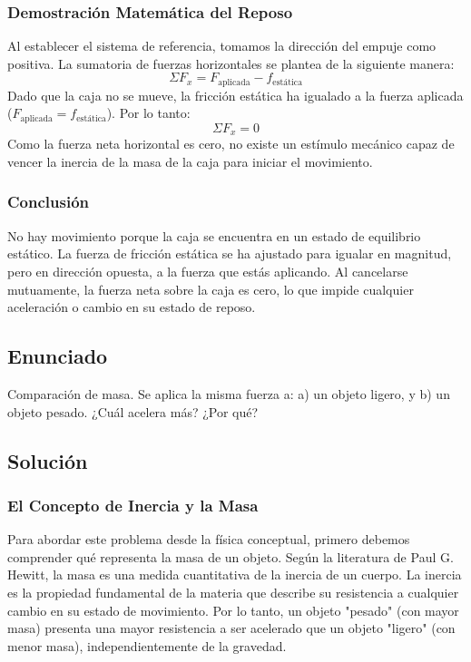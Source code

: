 \documentclass[12pt]{article}
\begin{document}
\subsubsection*{Demostración Matemática del Reposo}
Al establecer el sistema de referencia, tomamos la dirección del empuje como positiva. La sumatoria de fuerzas horizontales se plantea de la siguiente manera:
\begin{equation}
    \Sigma F_x = F_{\text{aplicada}} - f_{\text{estática}}
\end{equation}
Dado que la caja no se mueve, la fricción estática ha igualado a la fuerza aplicada ($F_{\text{aplicada}} = f_{\text{estática}}$). Por lo tanto:
\begin{equation}
    \Sigma F_x = 0
\end{equation}
Como la fuerza neta horizontal es cero, no existe un estímulo mecánico capaz de vencer la inercia de la masa de la caja para iniciar el movimiento.

\subsubsection*{Conclusión}
No hay movimiento porque la caja se encuentra en un estado de equilibrio estático. La fuerza de fricción estática se ha ajustado para igualar en magnitud, pero en dirección opuesta, a la fuerza que estás aplicando. Al cancelarse mutuamente, la fuerza neta sobre la caja es cero, lo que impide cualquier aceleración o cambio en su estado de reposo.

\newpage

\subsection*{Enunciado}
Comparación de masa. Se aplica la misma fuerza a: a) un objeto ligero, y b) un objeto pesado. ¿Cuál acelera más? ¿Por qué?

\subsection*{Solución}

\subsubsection*{El Concepto de Inercia y la Masa}
Para abordar este problema desde la física conceptual, primero debemos comprender qué representa la masa de un objeto. Según la literatura de Paul G. Hewitt, la masa es una medida cuantitativa de la inercia de un cuerpo. La inercia es la propiedad fundamental de la materia que describe su resistencia a cualquier cambio en su estado de movimiento. Por lo tanto, un objeto "pesado" (con mayor masa) presenta una mayor resistencia a ser acelerado que un objeto "ligero" (con menor masa), independientemente de la gravedad.
\end{document}
